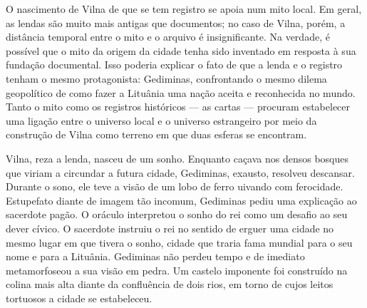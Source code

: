 \asterisc

O nascimento de Vilna de que se tem registro se apoia num mito local. Em
geral, as lendas são muito mais antigas que documentos; no caso de
Vilna, porém, a distância temporal entre o mito e o arquivo é
insignificante. Na verdade, é possível que o mito da origem da cidade
tenha sido inventado em resposta à sua fundação documental. Isso poderia
explicar o fato de que a lenda e o registro tenham o mesmo protagonista:
Gediminas, confrontando o mesmo dilema geopolítico de como fazer a
Lituânia uma nação aceita e reconhecida no mundo. Tanto o mito como os
registros históricos --- as cartas --- procuram estabelecer uma ligação
entre o universo local e o universo estrangeiro por meio da construção
de Vilna como terreno em que duas esferas se encontram.

Vilna, reza a lenda, nasceu de um sonho. Enquanto caçava nos densos
bosques que viriam a circundar a futura cidade, Gediminas, exausto,
resolveu descansar. Durante o sono, ele teve a visão de um lobo de ferro
uivando com ferocidade. Estupefato diante de imagem tão incomum,
Gediminas pediu uma explicação ao sacerdote pagão. O oráculo interpretou
o sonho do rei como um desafio ao seu dever cívico. O sacerdote instruiu
o rei no sentido de erguer uma cidade no mesmo lugar em que tivera o
sonho, cidade que traria fama mundial para o seu nome e para a Lituânia.
Gediminas não perdeu tempo e de imediato metamorfoseou a sua visão em
pedra. Um castelo imponente foi construído na colina mais alta diante da
confluência de dois rios, em torno de cujos leitos tortuosos a cidade se
estabeleceu.

